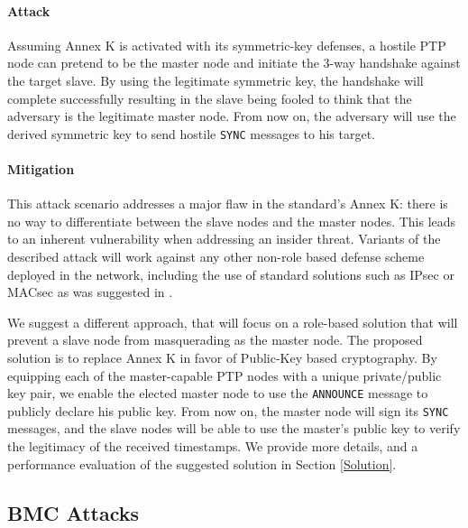 \documentclass[11pt]{article}
\begin{document}
\paragraph{Attack}

Assuming Annex K is activated with its symmetric-key defenses, a hostile PTP node can pretend to be the master node and initiate the 3-way handshake against the target slave. By using the legitimate symmetric key, the handshake will complete successfully resulting in the slave being fooled to think that the adversary is the legitimate master node. From now on, the adversary will use the derived symmetric key to send hostile \texttt{SYNC} messages to his target.



\paragraph{Mitigation}\label{time:scenrio6mit}

This attack scenario addresses a major flaw in the standard's Annex K: there is no way to differentiate between the slave nodes and the master nodes. This leads to an inherent vulnerability when addressing an insider threat. Variants of the described attack will work against any other non-role based defense scheme deployed in the network, including the use of standard solutions such as IPsec or MACsec as was suggested in \cite{ISPCS_2012}.



We suggest a different approach, that will focus on a role-based solution that will prevent a slave node from masquerading as the master node. The proposed solution is to replace Annex K in favor of Public-Key based cryptography. By equipping each of the master-capable PTP nodes with a unique private/public key pair, we enable the elected master node to use the \texttt{ANNOUNCE} message to publicly declare his public key. From now on, the master node will sign its \texttt{SYNC} messages, and the slave nodes will be able to use the master's public key to verify the legitimacy of the received timestamps. We provide more details, and a performance evaluation of the suggested solution in Section \ref{Solution}.





\subsection{BMC Attacks}\label{attack:bmc}
\end{document}
